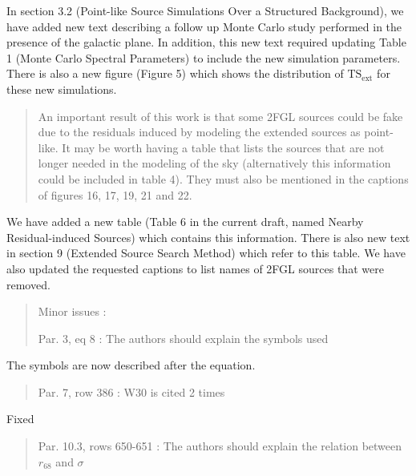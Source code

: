 \documentclass{article}
\newenvironment{referee}
{\begin{quote}\color{red}}
  {\end{quote}}
\newenvironment{reply}
  {}
  {}
\begin{document}
\begin{reply}
In section 3.2 (Point-like Source Simulations Over a Structured Background), we have added new text describing a
follow up Monte Carlo study performed in the presence of the galactic
plane. In addition, this new text required updating Table 1 (Monte Carlo
Spectral Parameters) to include the new simulation parameters. There is also
a new figure (Figure 5) which shows the distribution of $\mathrm{TS}_\mathrm{ext}$
for these
new simulations.
\end{reply}


\begin{referee}
An important result of this work is that some 2FGL sources could be fake due to the residuals induced by modeling the extended sources as point-like. It may be worth having a table that lists the sources that are not longer needed in the modeling of the sky (alternatively this information could be included in table 4). They must also be mentioned in the captions of figures 16, 17, 19, 21 and 22.
\end{referee}


\begin{reply}
We have added a new table (Table 6 in the current draft, named Nearby Residual-induced Sources) which contains
this information. There is also new text in section 9 (Extended Source
Search Method) which refer to this
table. We have also updated the requested captions to list names of 2FGL
sources that were removed.
\end{reply}


\begin{referee}
Minor issues :

Par. 3, eq 8 : The authors should explain the symbols used
\end{referee}


\begin{reply}
The symbols are now described after the equation.
\end{reply}


\begin{referee}
Par. 7, row 386 : W30 is cited 2 times
\end{referee}


\begin{reply}
Fixed
\end{reply}

\begin{referee}
  Par. 10.3, rows 650-651 : The authors should explain the relation between $r_{68}$ and $\sigma$
\end{referee}
\end{document}
